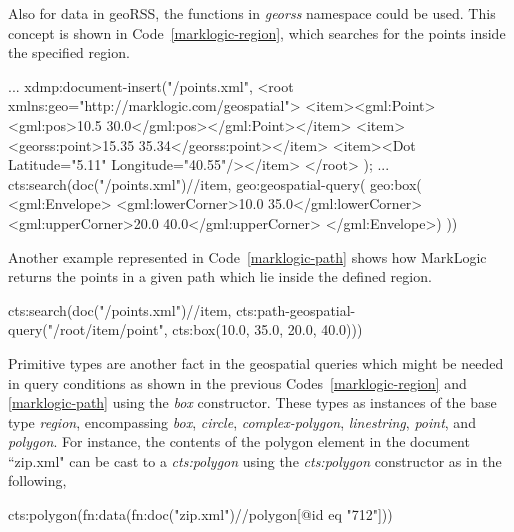 \documentclass[a4paper,12pt]{article}
\begin{document}
Also for data in geoRSS, the functions in \textit{georss} namespace could be used. 
This concept is shown in Code~\ref{marklogic-region}, which searches for the points inside the specified region. 
\vspace{10px}
\begin{fakeXML}[escapechar=\%,label=marklogic-region,caption=A query example in MarkLogic using geospatial functions]
...
xdmp:document-insert("/points.xml",
<root xmlns:geo="http://marklogic.com/geospatial">
  <item><gml:Point><gml:pos>10.5 30.0</gml:pos></gml:Point></item>
  <item><georss:point>15.35 35.34</georss:point></item>
  <item><Dot Latitude="5.11" Longitude="40.55"/></item>
</root> );
 ...
cts:search(doc("/points.xml")//item, 
 geo:geospatial-query(
   geo:box(
     <gml:Envelope>
       <gml:lowerCorner>10.0 35.0</gml:lowerCorner>
       <gml:upperCorner>20.0 40.0</gml:upperCorner>
     </gml:Envelope>)
 ))
 
 \end{fakeXML}
\vspace{10px}
Another example represented in Code~\ref{marklogic-path} shows how MarkLogic returns the 
points in a given path which lie inside the defined region.
\vspace{10px}
\begin{fakeXML}[escapechar=\%,label=marklogic-path,caption=A sample geospatial query in MarkLogic]
cts:search(doc("/points.xml")//item,
  cts:path-geospatial-query("/root/item/point", 
  			cts:box(10.0, 35.0, 20.0, 40.0)))
\end{fakeXML}
\vspace{10px}

Primitive types are another fact in the geospatial queries which might be needed in query conditions 
as shown in the previous Codes~\ref{marklogic-region} and \ref{marklogic-path} using the \textit{box} constructor. These types as instances of the base type \textit{region}, encompassing \textit{box}, \textit{circle}, \textit{complex-polygon}, \textit{linestring}, \textit{point}, and \textit{polygon}. For instance, the contents of the polygon element in the document ``zip.xml" can be cast to a \textit{cts:polygon} using the \textit{cts:polygon} constructor as in the following,
\vspace{10px}
\begin{fakeJSON}
cts:polygon(fn:data(fn:doc("zip.xml")//polygon[@id eq "712"]))
\end{fakeJSON}
\vspace{10px}
\end{document}
